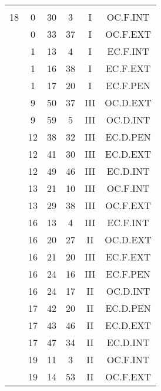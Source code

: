 \documentclass[12pt, a4paper]{article}
\begin{document}
\begin{multicols}{3}
{\begin{tabular}{c c c c c c}
	 	 	 	 & & & & & \\%
	 	 	 	18 & 0 & 30 & 3 & I & OC.F.INT\\%
	 	 	 	 & 0 & 33 & 37 & I & OC.F.EXT\\%
	 	 	 	 & 1 & 13 & 4 & I & EC.F.INT\\%
	 	 	 	 & 1 & 16 & 38 & I & EC.F.EXT\\%
	 	 	 	 & 1 & 17 & 20 & I & EC.F.PEN\\%
	 	 	 	 & 9 & 50 & 37 & III & OC.D.EXT\\%
	 	 	 	 & 9 & 59 & 5 & III & OC.D.INT\\%
	 	 	 	 & 12 & 38 & 32 & III & EC.D.PEN\\%
	 	 	 	 & 12 & 41 & 30 & III & EC.D.EXT\\%
	 	 	 	 & 12 & 49 & 46 & III & EC.D.INT\\%
	 	 	 	 & 13 & 21 & 10 & III & OC.F.INT\\%
	 	 	 	 & 13 & 29 & 38 & III & OC.F.EXT\\%
	 	 	 	 & 16 & 13 & 4 & III & EC.F.INT\\%
	 	 	 	 & 16 & 20 & 27 & II & OC.D.EXT\\%
	 	 	 	 & 16 & 21 & 20 & III & EC.F.EXT\\%
	 	 	 	 & 16 & 24 & 16 & III & EC.F.PEN\\%
	 	 	 	 & 16 & 24 & 17 & II & OC.D.INT\\%
	 	 	 	 & 17 & 42 & 20 & II & EC.D.PEN\\%
	 	 	 	 & 17 & 43 & 46 & II & EC.D.EXT\\%
	 	 	 	 & 17 & 47 & 34 & II & EC.D.INT\\%
	 	 	 	 & 19 & 11 & 3 & II & OC.F.INT\\%
	 	 	 	 & 19 & 14 & 53 & II & OC.F.EXT\\%

\end{tabular}}
\end{multicols}
\end{document}
